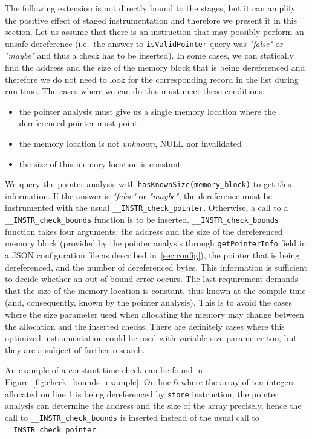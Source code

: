 The following extension is not directly bound to the stages, but it can amplify
the positive effect of staged instrumentation and therefore we present it in
this section. Let us assume that there is an instruction that may possibly
perform an unsafe dereference (i.e.~the answer to \texttt{isValidPointer}
query was \emph{"false"} or \emph{"maybe"} and thus a check has to be
inserted). In some cases, we can statically find the address and the size of
the memory block that is being dereferenced and therefore we do not need to
look for the corresponding record in the list during run-time. The cases where
we can do this must meet these conditions:
\begin{itemize}
\item the pointer analysis must give us a single memory location where the
dereferenced pointer must point
\item the memory location is not \emph{unknown}, NULL nor invalidated
\item the size of this memory location is constant
\end{itemize}

We query the pointer analysis with \texttt{hasKnownSize(memory\_block)}
to get this information.  If the answer is \emph{"false"} or \emph{"maybe"},
the dereference must be instrumented with the usual
\texttt{\_\_INSTR\_check\_pointer}. Otherwise, a call to a
\texttt{\_\_INSTR\_check\_bounds} function is to be inserted.
\texttt{\_\_INSTR\_check\_bounds} function takes four arguments: the address
and the size of the dereferenced memory block (provided by the pointer analysis
through \texttt{getPointerInfo} field in a JSON configuration file as
described in~\ref{sec:config}), the pointer that is being dereferenced, and
the number of dereferenced bytes.  This information is sufficient to decide
whether an out-of-bound error occurs.  The last requirement demands that the
size of the memory location is constant, thus known at the compile time (and,
consequently, known by the pointer analysis).  This is to avoid the cases where
the size parameter used when allocating the memory may change between the
allocation and the inserted checks.  There are definitely cases where this
optimized instrumentation could be used with variable size parameter too, but
they are a subject of further research.

An example of a constant-time check can be found in
Figure~\ref{fig:check_bounds_example}. On line 6 where the array of ten
integers allocated on line 1 is being dereferenced by \texttt{store}
instruction, the pointer analysis can determine the address and the size of the
array precisely, hence the call to \texttt{\_\_INSTR\_check\_bounds} is
inserted instead of the usual call to \texttt{\_\_INSTR\_check\_pointer}.

